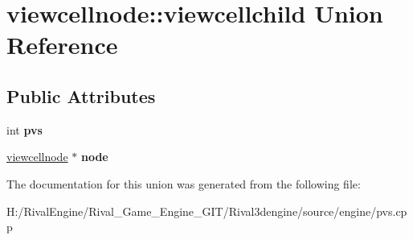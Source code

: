 \hypertarget{unionviewcellnode_1_1viewcellchild}{}\section{viewcellnode\+:\+:viewcellchild Union Reference}
\label{unionviewcellnode_1_1viewcellchild}
\subsection*{Public Attributes}
\begin{DoxyCompactItemize}
\item 
\mbox{\label{unionviewcellnode_1_1viewcellchild_ae1561717a1af7c79d54c5e0335956ca4}} 
int {\bfseries pvs}
\item 
\mbox{\label{unionviewcellnode_1_1viewcellchild_a07472ee5f9f764c2e658c916cfab5042}} 
\hyperlink{structviewcellnode}{viewcellnode} $\ast$ {\bfseries node}
\end{DoxyCompactItemize}


The documentation for this union was generated from the following file\+:\begin{DoxyCompactItemize}
\item 
H\+:/\+Rival\+Engine/\+Rival\+\_\+\+Game\+\_\+\+Engine\+\_\+\+G\+I\+T/\+Rival3dengine/source/engine/pvs.\+cpp\end{DoxyCompactItemize}
